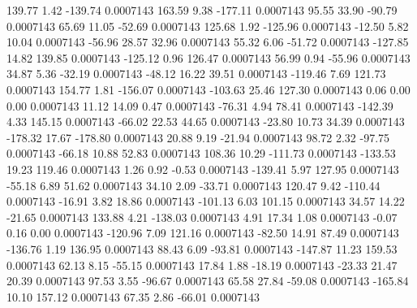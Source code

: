       139.77        1.42     -139.74     0.0007143
      163.59        9.38     -177.11     0.0007143
       95.55       33.90      -90.79     0.0007143
       65.69       11.05      -52.69     0.0007143
      125.68        1.92     -125.96     0.0007143
      -12.50        5.82       10.04     0.0007143
      -56.96       28.57       32.96     0.0007143
       55.32        6.06      -51.72     0.0007143
     -127.85       14.82      139.85     0.0007143
     -125.12        0.96      126.47     0.0007143
       56.99        0.94      -55.96     0.0007143
       34.87        5.36      -32.19     0.0007143
      -48.12       16.22       39.51     0.0007143
     -119.46        7.69      121.73     0.0007143
      154.77        1.81     -156.07     0.0007143
     -103.63       25.46      127.30     0.0007143
        0.06        0.00        0.00     0.0007143
       11.12       14.09        0.47     0.0007143
      -76.31        4.94       78.41     0.0007143
     -142.39        4.33      145.15     0.0007143
      -66.02       22.53       44.65     0.0007143
      -23.80       10.73       34.39     0.0007143
     -178.32       17.67     -178.80     0.0007143
       20.88        9.19      -21.94     0.0007143
       98.72        2.32      -97.75     0.0007143
      -66.18       10.88       52.83     0.0007143
      108.36       10.29     -111.73     0.0007143
     -133.53       19.23      119.46     0.0007143
        1.26        0.92       -0.53     0.0007143
     -139.41        5.97      127.95     0.0007143
      -55.18        6.89       51.62     0.0007143
       34.10        2.09      -33.71     0.0007143
      120.47        9.42     -110.44     0.0007143
      -16.91        3.82       18.86     0.0007143
     -101.13        6.03      101.15     0.0007143
       34.57       14.22      -21.65     0.0007143
      133.88        4.21     -138.03     0.0007143
        4.91       17.34        1.08     0.0007143
       -0.07        0.16        0.00     0.0007143
     -120.96        7.09      121.16     0.0007143
      -82.50       14.91       87.49     0.0007143
     -136.76        1.19      136.95     0.0007143
       88.43        6.09      -93.81     0.0007143
     -147.87       11.23      159.53     0.0007143
       62.13        8.15      -55.15     0.0007143
       17.84        1.88      -18.19     0.0007143
      -23.33       21.47       20.39     0.0007143
       97.53        3.55      -96.67     0.0007143
       65.58       27.84      -59.08     0.0007143
     -165.84       10.10      157.12     0.0007143
       67.35        2.86      -66.01     0.0007143
